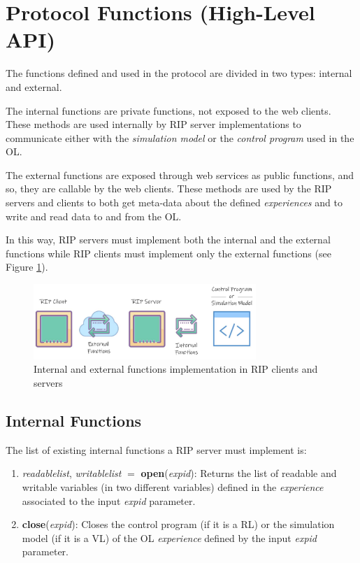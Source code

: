 \section{Protocol Functions (High-Level API)}
The functions defined and used in the protocol are divided in two types: internal and external.

The internal functions are private functions, not exposed to the web clients. These methods are used internally by RIP server implementations to communicate either with the \textit{simulation model} or the \textit{control program} used in the OL.

The external functions are exposed through web services as public functions, and so, they are callable by the web clients. These methods are used by the RIP servers and clients to both get meta-data about the defined \textit{experiences} and to write and read data to and from the OL.

In this way, RIP servers must implement both the internal and the external functions while RIP clients must implement only the external functions (see Figure \ref{fig:Functions_Implementation}).

\begin{figure}
\centering
\includegraphics[width=0.75\textwidth]{images/FunctionsImplementation.pdf}
\caption{Internal and external functions implementation in RIP clients and servers}
\label{fig:Functions_Implementation}
\end{figure}

\subsection{Internal Functions}
\label{sec:Internal_Functions}
The list of existing internal functions a RIP server must implement is:

\begin{enumerate}
    \item \textit{readablelist}, \textit{writablelist}  $=$ \textbf{open}(\textit{expid}): Returns the list of readable and writable variables (in two different variables) defined in the \textit{experience} associated to the input \textit{expid} parameter.
    \item \textbf{close}(\textit{expid}): Closes the control program (if it is a RL) or the simulation model (if it is a VL) of the OL \textit{experience} defined by the input \textit{expid} parameter.
\end{enumerate}

